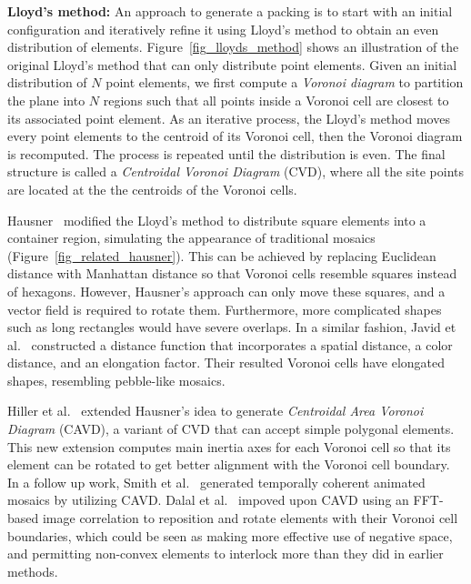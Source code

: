 
\textbf{Lloyd's method:}
An approach to generate a packing is to start with an initial configuration and iteratively refine it using Lloyd's method
to obtain an even distribution of elements. 
Figure~\ref{fig_lloyds_method} shows an illustration of the original Lloyd's method that can only distribute point elements.
Given an initial distribution of $N$ point elements, 
we first compute a \textit{Voronoi diagram} to partition the plane into $N$ regions such that
all points inside a Voronoi cell are closest to its associated point element.
As an iterative process, 
the Lloyd's method moves every point elements to the centroid of its Voronoi cell, 
then the Voronoi diagram is recomputed.
The process is repeated until the distribution is even.
The final structure is called a \textit{Centroidal Voronoi Diagram} (CVD), 
where all the site points are located at the the centroids of the Voronoi cells. 

Hausner~\cite{Hausner2001} modified the Lloyd's method to distribute square elements into a container 
region, simulating the appearance of traditional mosaics (Figure~\ref{fig_related_hausner}). 
This can be achieved by replacing Euclidean distance with Manhattan distance so that Voronoi cells resemble squares instead of hexagons.
However, Hausner's approach can only move these squares, and a vector field is required to rotate them.
Furthermore, more complicated shapes such as long rectangles would have severe overlaps.
In a similar fashion, Javid et al.~\cite{Javid2019} constructed a distance function that 
incorporates a spatial distance, a color distance, and an elongation factor. Their resulted
Voronoi cells have elongated shapes, resembling pebble-like mosaics.

Hiller et al.~\cite{Hiller2003} extended Hausner's idea to generate \textit{Centroidal Area Voronoi Diagram} (CAVD),
a variant of CVD that can accept simple polygonal elements.
This new extension computes main inertia axes for each Voronoi cell so that 
its element can be rotated to get better alignment
with the Voronoi cell boundary.
In a follow up work, Smith et al.~\cite{Smith2005} generated temporally coherent animated mosaics by utilizing CAVD.
Dalal et al.~\cite{Dalal2006} impoved upon CAVD using an FFT-based image correlation to reposition
and rotate elements with their Voronoi cell boundaries, which could be seen as making more effective use of negative
space, and permitting non-convex elements to interlock more than they did in
earlier methods.


